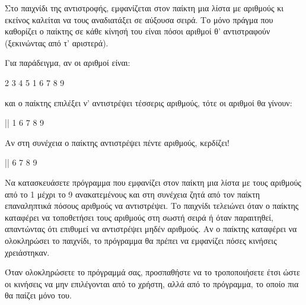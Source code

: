 \documentclass[a4paper,11pt,oneside]{book}
\begin{document}
\begin{exercise}
Στο παιχνίδι της αντιστροφής, εμφανίζεται στον παίκτη μια λίστα με αριθμούς κι εκείνος καλείται να τους αναδιατάξει σε αύξουσα σειρά. Το μόνο πράγμα που καθορίζει ο παίκτης σε κάθε κίνησή του είναι πόσοι αριθμοί θ' αντιστραφούν (ξεκινώντας από τ' αριστερά).

Για παράδειγμα, αν οι αριθμοί είναι:

\begin{pyterm}
2 3 4 5 1 6 7 8 9
\end{pyterm}

και ο παίκτης επιλέξει ν' αντιστρέψει τέσσερις αριθμούς, τότε οι αριθμοί θα γίνουν:

\begin{pyterm}
|| 1 6 7 8 9
\end{pyterm}

Αν στη συνέχεια ο παίκτης αντιστρέψει πέντε αριθμούς, κερδίζει!

\begin{pyterm}
|| 6 7 8 9
\end{pyterm}

Να κατασκευάσετε πρόγραμμα που εμφανίζει στον παίκτη μια λίστα με τους αριθμούς από το 1 μέχρι το 9 ανακατεμένους και στη συνέχεια ζητά από τον παίκτη επαναληπτικά πόσους αριθμούς να αντιστρέψει. Το παιχνίδι τελειώνει όταν ο παίκτης καταφέρει να τοποθετήσει τους αριθμούς στη σωστή σειρά ή όταν παραιτηθεί, απαντώντας ότι επιθυμεί να αντιστρέψει μηδέν αριθμούς. Αν ο παίκτης καταφέρει να ολοκληρώσει το παιχνίδι, το πρόγραμμα θα πρέπει να εμφανίζει πόσες κινήσεις χρειάστηκαν.

Όταν ολοκληρώσετε το πρόγραμμά σας, προσπαθήστε να το τροποποιήσετε έτσι ώστε οι κινήσεις να μην επιλέγονται από το χρήστη, αλλά από το πρόγραμμα, το οποίο πια θα παίζει μόνο του.
\end{exercise}
\end{document}
